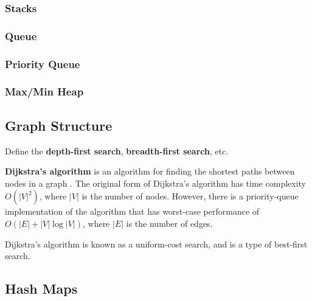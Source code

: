 \subsubsection{Stacks}

\subsubsection{Queue}

\subsubsection{Priority Queue}

\subsubsection{Max/Min Heap}

\subsection{Graph Structure}

Define the \textbf{depth-first search}, \textbf{breadth-first search}, etc.

\textbf{Dijkstra's algorithm} is an algorithm for finding the shortest paths between nodes in a graph \cite{DijkstraAlgorithm}. The original form of Dijkstra's algorithm has time complexity $O(|V|^{2})$, where $|V|$ is the number of nodes. However, there is a priority-queue implementation of the algorithm that has worst-case performance of $O(|E|+|V| \log |V|)$, where $|E|$ is the number of edges. 

Dijkstra's algorithm is known as a uniform-cost search, and is a type of best-first search. 

\subsection{Hash Maps}


